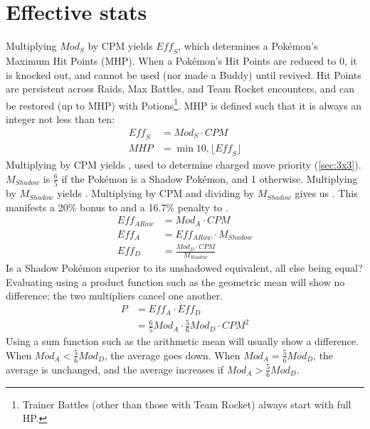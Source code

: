 \section{Effective stats\label{sec:effectivestats}}
Multiplying $\mathit{Mod_S}$ by CPM yields $\mathit{Eff_S}$, which determines a Pokémon's Maximum Hit Points (MHP).
When a Pokémon's Hit Points are reduced to 0, it is knocked out, and cannot be
 used (nor made a Buddy) until revived.
Hit Points are persistent across Raids, Max Battles, and Team Rocket encounters,
 and can be restored (up to MHP) with Potions\footnote{Trainer Battles (other
 than those with Team Rocket) always start with full HP.}.
MHP is defined such that it is always an integer not less than ten:
\begin{align*}
 \mathit{Eff_S} &= \mathit{Mod_S} \cdot CPM \\
 MHP &= \min{10, \lfloor \mathit{Eff_S} \rfloor}
\end{align*}
Multiplying  by CPM yields , used to determine charged move priority (\autoref{sec:3x3}).
$M_{Shadow}$ is $\frac{6}{5}$ if the Pokémon is a Shadow Pokémon, and 1 otherwise.
Multiplying  by $M_{Shadow}$ yields .
Multiplying  by CPM and dividing by $M_{Shadow}$ gives us .
This manifests a 20\% bonus to  and a 16.7\% penalty to .
\begin{align*}
  Eff_{ARaw} &= Mod_A \cdot CPM\\
  Eff_A &= Eff_{ARaw} \cdot M_{Shadow} \\
 Eff_D &= \frac{Mod_D \cdot CPM}{M_{Shadow}}
\end{align*}
Is a Shadow Pokémon superior to its unshadowed equivalent, all else being equal?
Evaluating using a product function such as the geometric mean will show no difference;
 the two multipliers cancel one another.
\begin{align*}
  P &= Eff_A \cdot Eff_D\\
  &= \frac{6}{5}Mod_A \cdot \frac{5}{6}Mod_D \cdot CPM^2
\end{align*}
Using a sum function such as the arithmetic mean will usually show a difference.
When $Mod_A < \frac{5}{6}Mod_D$, the average goes down.
When $Mod_A = \frac{5}{6}Mod_D$, the average is unchanged,
 and the average increases if $Mod_A > \frac{5}{6}Mod_D$.

